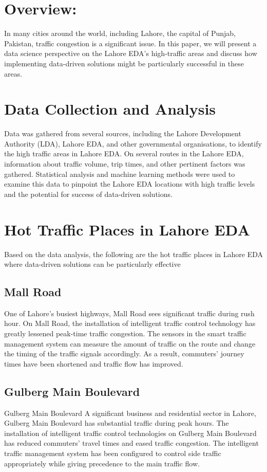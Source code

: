 \documentclass[12pt,a4paper]{article}
\begin{document}
	
 
 \clearpage
\tableofcontents
\clearpage
\section{Overview:}
In many cities around the world, including Lahore, the capital of Punjab, Pakistan, traffic congestion is a significant issue. In this paper, we will present a data science perspective on the Lahore EDA's high-traffic areas and discuss how implementing data-driven solutions might be particularly successful in these areas.
\subparagraph{}
\section{Data Collection and Analysis}
Data was gathered from several sources, including the Lahore Development Authority (LDA), Lahore EDA, and other governmental organisations, to identify the high traffic areas in Lahore EDA. On several routes in the Lahore EDA, information about traffic volume, trip times, and other pertinent factors was gathered. Statistical analysis and machine learning methods were used to examine this data to pinpoint the Lahore EDA locations with high traffic levels and the potential for success of data-driven solutions.
\section{Hot Traffic Places in Lahore EDA}
Based on the data analysis, the following are the hot traffic places in Lahore EDA where data-driven solutions can be particularly effective

\subsection{Mall Road}
One of Lahore's busiest highways, Mall Road sees significant traffic during rush hour. On Mall Road, the installation of intelligent traffic control technology has greatly lessened peak-time traffic congestion. The sensors in the smart traffic management system can measure the amount of traffic on the route and change the timing of the traffic signals accordingly. As a result, commuters' journey times have been shortened and traffic flow has improved.
\subsection{Gulberg Main Boulevard}
Gulberg Main Boulevard
A significant business and residential sector in Lahore, Gulberg Main Boulevard has substantial traffic during peak hours. The installation of intelligent traffic control technologies on Gulberg Main Boulevard has reduced commuters' travel times and eased traffic congestion. The intelligent traffic management system has been configured to control side traffic appropriately while giving precedence to the main traffic flow.
\end{document}
